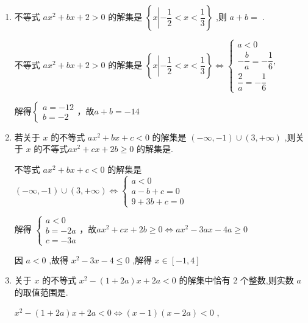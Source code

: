 \begin{enumerate}
\begin{jieda}
         故$\left( {{ax} - a}\right) \left( {x + 2}\right)  < 0 \Longrightarrow  \left( {x - 1}\right) \left( {x + 2}\right)  < 0$，解得$- 2 < x < 1$ 
    \end{jieda}
    \item 不等式 $a{x}^{2} + {bx} + 2 > 0$ 的解集是 $\left\{  {x\left| { - \dfrac{1}{2} < x < \dfrac{1}{3}}\right. }\right\}$ ,则 $a + b =$ .
    \begin{jieda}
        不等式 $a{x}^{2} + {bx} + 2 > 0$ 的解集是 $\left\{  {x\left| { - \dfrac{1}{2} < x < \dfrac{1}{3}}\right. }\right\} \Longleftrightarrow \left\{  \begin{array}{l} a < 0 \\   - \dfrac{b}{a} =  - \dfrac{1}{6}, \\  \dfrac{2}{a} =  - \dfrac{1}{6} \end{array}\right.$ 
        
        解得$\left\{  {\begin{array}{l} a =  - {12} \\  b =  - 2 \end{array}}\right.$，故$a + b =  - {14}$
    \end{jieda}
    \item 若关于 $x$ 的不等式 $a{x}^{2} + {bx} + c < 0$ 的解集是 $\left( {-\infty , - 1}\right)  \cup  \left( {3, + \infty }\right)$ ,则关于 $x$ 的不等式$a{x}^{2} + {cx} + {2b} \geq  0$ 的解集是.
    \begin{jieda}
        不等式 $a{x}^{2} + {bx} + c < 0$ 的解集是 $\left( {-\infty , - 1}\right)  \cup  \left( {3, + \infty }\right) \Longleftrightarrow \left\{  \begin{array}{l}  
        a < 0 \\
        a-b+c = 0 \\  
        9+3b+c =  0 
        \end{array}\right.$
        
        解得 $\left\{\begin{array}{l}
             a < 0 \\
             b =  - {2a}  \\
             c =  - {3a} 
        \end{array}\right.$，故$a{x}^{2} + {cx} + {2b} \geq  0 \Longleftrightarrow a{x}^{2} - {3ax} - {4a} \geq  0$
        
        因 $a < 0$ ,故得 ${x}^{2} - {3x} - 4 \leq  0$ ,解得 $x \in \left\lbrack  {-1,4}\right\rbrack$
    \end{jieda}
    \item 关于 $x$ 的不等式 ${x}^{2} - \left( {1 + {2a}}\right) x + {2a} < 0$ 的解集中恰有 2 个整数,则实数 $a$ 的取值范围是.
    \begin{jieda}
        ${x}^{2} - \left( {1 + {2a}}\right) x + {2a} < 0 \Longleftrightarrow \left( {x - 1}\right) \left( {x - {2a}}\right)  < 0$ ,


\end{jieda}
\end{enumerate}
